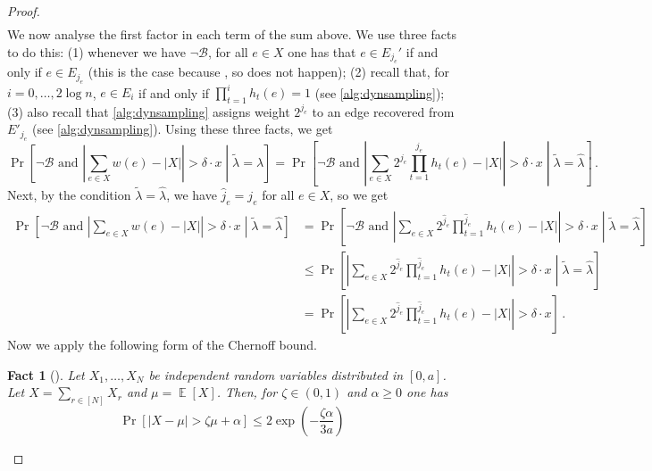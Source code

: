 \documentclass[epsfig,letter,11pt]{article}
\numberwithin{equation}{section}
\DeclareMathOperator{\ex}{\mathbb{E}}
\renewcommand{\hat}{\widehat}
\renewcommand{\tilde}{\widetilde}
\newtheorem{fact}[theorem]{Fact}
\begin{document}
\begin{proof}
\begin{align*}
	\end{align*}
	We now analyse the first factor in each term of the sum above. We use three facts to do this: (1) whenever we have $\neg \mathcal{B}$, for all $e \in X$ one has that $e \in E_{j_e}'$ if and only if $e \in E_{j_e}$ (this is the case because \smash{$\frac{1}{2} \lambda \le {\tilde{\lambda}} \le \frac{3}{2} \lambda$}, so  does not happen); (2) recall that, for $i=0,\dots,2\log n$, $e \in E_{i}$ if and only if $\prod_{t=1}^{i}h_t(e)=1$ (see \cref{alg:dynsampling}); (3) also recall that \cref{alg:dynsampling} assigns weight $2^{j_e}$ to an edge recovered from $E'_{j_e}$ (see \cref{alg:dynsampling}).
	Using these three facts, we get
	\begin{equation*}
		 \Pr\left[\neg \mathcal{B} \text{ and } \left|\sum_{e \in X} w(e) - |X|\right| > \delta \cdot x  \middle| \tilde{\lambda}=\hat{\lambda} \right]
		= \Pr\left[\neg \mathcal{B} \text{ and } \left|\sum_{e \in X} 2^{j_e}\prod_{t=1}^{j_e}h_t(e) - |X|\right| > \delta \cdot x  \middle| \tilde{\lambda}=\hat{\lambda} \right] \, .
	\end{equation*}
	Next, by the condition $\tilde{\lambda}=\hat{\lambda}$, we have $\hat{j}_e=j_e$ for all $e \in X$, so we get
	\begin{align*}
	\Pr\left[\neg \mathcal{B} \text{ and } \left|\sum_{e \in X} w(e) - |X|\right| > \delta \cdot x  \middle| \tilde{\lambda}=\hat{\lambda} \right]
		& =  \Pr\left[\neg \mathcal{B} \text{ and } \left|\sum_{e \in X} 2^{\hat{j}_e}\prod_{t=1}^{\hat{j}_e}h_t(e) - |X|\right| > \delta \cdot x  \middle| \tilde{\lambda}=\hat{\lambda} \right] \\
		& \le \Pr\left[\left|\sum_{e \in X} 2^{\hat{j}_e}\prod_{t=1}^{\hat{j}_e}h_t(e) - |X|\right| > \delta \cdot x  \middle| \tilde{\lambda}=\hat{\lambda} \right] \\
		& = \Pr\left[\left|\sum_{e \in X} 2^{\hat{j}_e}\prod_{t=1}^{\hat{j}_e}h_t(e) - |X|\right| > \delta \cdot x \right]  \, .
	\end{align*}
	Now we apply the following form of the Chernoff bound.
	\begin{fact}[\cite{streamexpdec}]
		Let $X_1,\dots,X_N$ be independent random variables distributed in $[0,a]$. Let $X= \sum_{r \in [N]} X_r$ and $\mu = \ex[X]$. Then, for $\zeta \in (0,1)$ and $\alpha \ge 0$ one has
		\begin{equation*}
			\Pr\left[\left| X- \mu \right| > \zeta \mu+\alpha \right] \le 2 \exp\left(-\frac{\zeta \alpha}{3a}\right)

\end{equation*}
\end{fact}
\end{proof}
\end{document}
